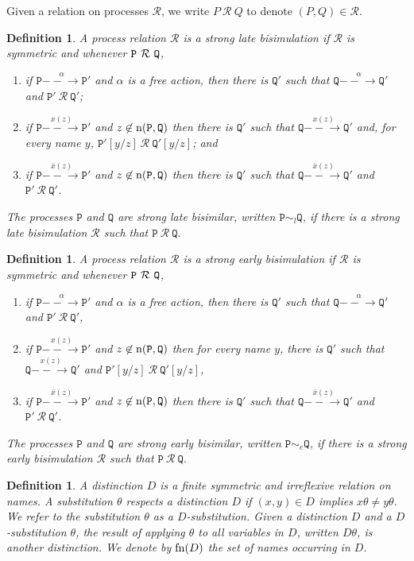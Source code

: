 \documentclass{acmtrans2m}
\newenvironment{definition}{\begin{define} \rm}{\end{define}}
\newtheorem{define}[theorem]{Definition}
\def\Rscr{{\mathcal R}}
\def\Ppi{{\mathtt P}}
\def\Qpi{{\mathtt Q}}
\newcommand{\one  }[3]{#1\stackrel{#2}{-\!\!-\!\!\!\rightarrow    } #3}
\newcommand{\fn}[1]{{\rm fn}(#1)}
\newcommand{\n}[1]{{\rm n}(#1)}
\begin{document}
Given a relation on processes $\Rscr$, we write $P~\Rscr ~ Q$
to denote $(P,Q) \in \Rscr.$

\begin{definition} 
\label{def:lbisim}
A process relation $\Rscr$ is a {\em strong late bisimulation}
if $\Rscr$ is symmetric and whenever $\Ppi ~ {\cal R} ~ \Qpi$,
\begin{enumerate}
\item if $\one{\Ppi}{\alpha}{\Ppi'}$ and $\alpha$ is a free action,
  then there is $\Qpi'$ such that
  $\one{\Qpi}{\alpha}{\Qpi'}$ and $\Ppi'  ~ \Rscr ~ \Qpi'$;
\item if $\one{\Ppi}{x(z)}{\Ppi'}$ and $z \not \in \n{\Ppi,\Qpi}$ 
  then there is $\Qpi'$ such that
  $\one{\Qpi}{x(z)}{\Qpi'}$ and, for every name $y$, 
  $\Ppi'[y/z] ~\Rscr ~ \Qpi'[y/z]$; and 
\item if $\one{\Ppi}{\bar{x}(z)}{\Ppi'}$ and $z \not \in \n{\Ppi,\Qpi}$ 
  then there is $\Qpi'$
  such that $\one{\Qpi}{\bar{x}(z)}{\Qpi'}$ and $\Ppi' ~\Rscr ~ \Qpi'$.
\end{enumerate}
The processes $\Ppi$ and $\Qpi$ are {\em strong late bisimilar},
written $\Ppi \sim_l \Qpi$, if there is a strong late bisimulation
$\Rscr$ such that $\Ppi ~ \Rscr ~ \Qpi.$
\end{definition}

\begin{definition} 
\label{def:ebisim}
A process relation $\Rscr$ is a {\em strong early bisimulation}
if $\Rscr$ is symmetric and whenever $\Ppi ~ {\cal R} ~ \Qpi$,
\begin{enumerate}
\item if $\one{\Ppi}{\alpha}{\Ppi'}$ and $\alpha$ is a free action,
  then there is $\Qpi'$ such that
  $\one{\Qpi}{\alpha}{\Qpi'}$ and $\Ppi' ~\Rscr ~ \Qpi'$,
\item if $\one{\Ppi}{x(z)}{\Ppi'}$ and $z \not \in \n{\Ppi,\Qpi}$ 
  then for every name $y$, there is $\Qpi'$ such that
  $\one{\Qpi}{x(z)}{\Qpi'}$ and $\Ppi'[y/z] ~\Rscr ~ \Qpi'[y/z]$,
\item if $\one{\Ppi}{\bar{x}(z)}{\Ppi'}$ and $z \not \in \n{\Ppi,\Qpi}$ 
  then there is $\Qpi'$
  such that $\one{\Qpi}{\bar{x}(z)}{\Qpi'}$ and $\Ppi' ~\Rscr ~ \Qpi'$.
\end{enumerate}
The processes $\Ppi$ and $\Qpi$ are {\em strong early bisimilar}, written 
$\Ppi \sim_e \Qpi$, if there is a strong early bisimulation $\Rscr$ such that
$\Ppi ~ \Rscr ~ \Qpi.$
\end{definition}

\begin{definition} 
A {\em distinction} $D$ is a finite symmetric and irreflexive relation
on names.  A substitution $\theta$ {\em respects} a distinction $D$ if
$(x,y) \in D$ implies $x\theta \not= y\theta$. We refer to the
substitution $\theta$ as a {\em $D$-substitution}.  Given a distinction
$D$ and a $D$-substitution $\theta$, the result of applying $\theta$
to all variables in $D$, written $D\theta$, is another distinction.
We denote by $\fn{D}$ the set of names occurring in $D$.
\end{definition}
\end{document}
